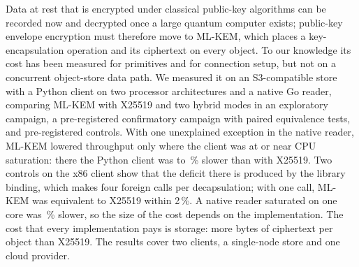 Data at rest that is encrypted under classical public-key algorithms can be recorded now and
decrypted once a large quantum computer exists; public-key envelope encryption must therefore move to
ML-KEM, which places a key-encapsulation operation and its ciphertext on every object. To our knowledge its cost has been measured for primitives and for connection setup, but not on
a concurrent object-store data path. We measured it on an S3-compatible store with a Python client
on two processor architectures and a native Go reader, comparing ML-KEM with X25519 and two
hybrid modes in an exploratory campaign, a pre-registered confirmatory campaign with paired
equivalence tests, and pre-registered controls. With one unexplained exception in the native reader, ML-KEM lowered throughput only where
the client was at or near CPU saturation: there the Python client was \RevHotDeficit{} to
\ArmHotDeficit\,\% slower than with X25519. Two controls on the x86 client show that the
deficit there is produced by the library binding, which makes four foreign calls per decapsulation;
with one call, ML-KEM was equivalent to X25519 within 2\,\%. A native reader saturated on one
core was \AudNOneMlkemDeficit\,\% slower, so the size of the cost depends on the implementation. The cost that every implementation pays is storage: \RevMetaIntrinsic{} more bytes of
ciphertext per object than X25519. The results cover two clients, a single-node store
and one cloud provider.
